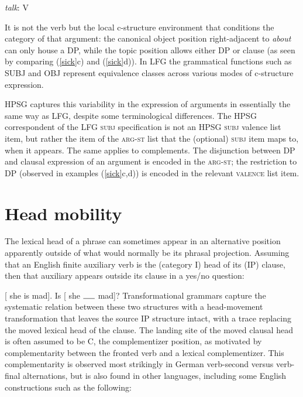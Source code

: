 \eal \label{talk-about}
{{\it talk}\/: V}\qquad{}    
\zl

\noindent
It is not the verb but the local c-structure environment that conditions the category of that argument: the canonical object position right-adjacent to \textit{about} can only house a DP, while the topic position allows either DP or clause (as seen by comparing (\ref{sick}c) and (\ref{sick}d)).  In LFG the grammatical functions such as SUBJ and OBJ represent equivalence classes across various modes of c-structure expression.  

HPSG captures this variability in the expression of arguments in essentially the same way as LFG, despite some terminological differences.  The HPSG correspondent of the LFG \textsc{subj} specification is not an HPSG \textsc{subj} valence list item, but rather the item of the \textsc{arg-st} list that the (optional) \textsc{subj}  item maps to, when it appears.  The same applies to complements.  The disjunction between DP and clausal expression of an argument is encoded in the \textsc{arg-st;} the restriction to DP (observed in examples (\ref{sick}c,d)) is encoded in the relevant \textsc{valence} list item.  


\section{Head mobility} 
\label{mobile-sec}
The lexical head of a phrase can sometimes appear in an alternative position apparently outside of what would normally be its phrasal projection.  Assuming that an English finite auxiliary verb is the (category I) head of its (IP) clause, then that auxiliary appears outside its clause in a yes/no question:

\eal 
\label{mad}
\ex {} [ she is mad].
\ex  Is   [ she $\rule{0.5cm}{0.15mm}$ mad]?
\zl
Transformational grammars capture the systematic relation between these two structures with a head-movement transformation that leaves the source IP structure intact, with a trace replacing the moved lexical head of the clause.  The landing site of the moved clausal head is often assumed to be C, the complementizer position, as motivated by complementarity between the fronted verb and a lexical complementizer.  This complementarity is observed most strikingly in German verb-second versus verb-final alternations, but is also found in other languages, including some English constructions such as the following:  

